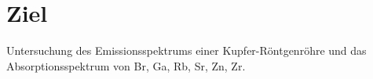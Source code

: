 \section{Ziel}
\label{sec:ziel}

Untersuchung des Emissionsspektrums einer Kupfer-Röntgenröhre und das Absorptionsspektrum von Br, Ga, Rb, Sr, Zn, Zr.
